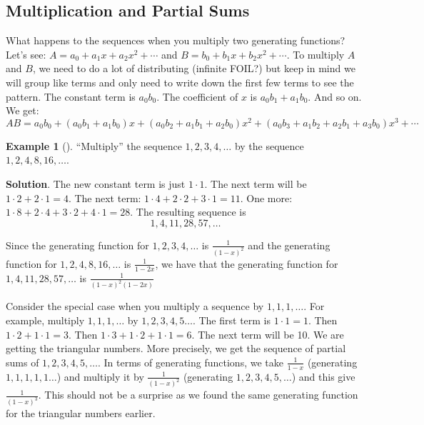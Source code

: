 \documentclass[10pt,]{book}
\theoremstyle{plain}
\theoremstyle{definition}
\theoremstyle{definition}
\newtheorem{example}[theorem]{Example}
\theoremstyle{definition}
\theoremstyle{definition}
\numberwithin{equation}{chapter}
\begin{document}
\subsection[{Multiplication and Partial Sums}]{Multiplication and Partial Sums}\label{subsection-26}
\hypertarget{p-1101}{}%
What happens to the sequences when you multiply two generating functions? Let's see: \(A = a_0 + a_1x + a_2x^2 + \cdots\) and \(B = b_0 + b_1x + b_2x^2 + \cdots\). To multiply \(A\) and \(B\), we need to do a lot of distributing (infinite FOIL?) but keep in mind we will group like terms and only need to write down the first few terms to see the pattern. The constant term is \(a_0b_0\). The coefficient of \(x\) is \(a_0b_1 + a_1b_0\). And so on. We get:%
\begin{equation*}
AB = a_0b_0 + (a_0b_1 + a_1b_0)x + (a_0b_2 + a_1b_1 + a_2b_0)x^2 + (a_0b_3 + a_1b_2 + a_2b_1 + a_3b_0)x^3 + \cdots
\end{equation*}
%
\begin{example}[]\label{example-26}
\hypertarget{p-1102}{}%
``Multiply'' the sequence \(1, 2, 3, 4, \ldots\) by the sequence \(1, 2, 4, 8, 16, \ldots\).%
\par\smallskip%
\noindent\textbf{Solution}.\hypertarget{solution-100}{}\quad%
\hypertarget{p-1103}{}%
The new constant term is just \(1 \cdot 1\). The next term will be \(1\cdot 2 + 2 \cdot 1 = 4\). The next term: \(1 \cdot 4 + 2 \cdot 2 + 3 \cdot 1 = 11\). One more: \(1 \cdot 8 + 2 \cdot 4 + 3 \cdot 2 + 4 \cdot 1 = 28\). The resulting sequence is%
\begin{equation*}
1, 4, 11, 28, 57, \ldots
\end{equation*}
%
\par
\hypertarget{p-1104}{}%
Since the generating function for \(1,2,3,4, \ldots\) is \(\frac{1}{(1-x)^2}\) and the generating function for \(1,2,4,8, 16, \ldots\) is \(\frac{1}{1-2x}\), we have that the generating function for \(1,4, 11, 28, 57, \ldots\) is \(\frac{1}{(1-x)^2(1-2x)}\)%
\end{example}
\hypertarget{p-1105}{}%
Consider the special case when you multiply a sequence by \(1, 1, 1, \ldots\). For example, multiply \(1,1,1,\ldots\) by \(1, 2, 3, 4, 5\ldots\). The first term is \(1\cdot 1 = 1\). Then \(1\cdot 2 + 1 \cdot 1 = 3\). Then \(1\cdot 3 + 1\cdot 2 + 1 \cdot 1 = 6\). The next term will be 10. We are getting the triangular numbers. More precisely, we get the sequence of partial sums of \(1,2,3,4,5, \ldots\). In terms of generating functions, we take \(\frac{1}{1-x}\) (generating \(1,1,1,1,1\ldots\)) and multiply it by \(\frac{1}{(1-x)^2}\) (generating \(1,2,3,4,5,\ldots\)) and this give \(\frac{1}{(1-x)^3}\). This should not be a surprise as we found the same generating function for the triangular numbers earlier.%
\end{document}
